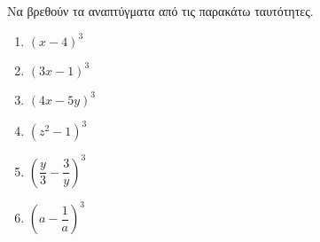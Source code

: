 Να βρεθούν τα αναπτύγματα από τις παρακάτω ταυτότητες.
\begin{multicols}{3}
\begin{enumerate}[label=\roman*.]
\item $ \left(x-4 \right)^3 $
\item $ \left(3x-1 \right)^3 $
\item $ \left(4x-5y \right)^3 $
\item $ \left(z^2-1 \right)^3 $
\item $ \left(\dfrac{y}{3}-\dfrac{3}{y} \right)^3 $
\item $ \left(a-\dfrac{1}{a}\right)^3 $
\end{enumerate}
\end{multicols}
